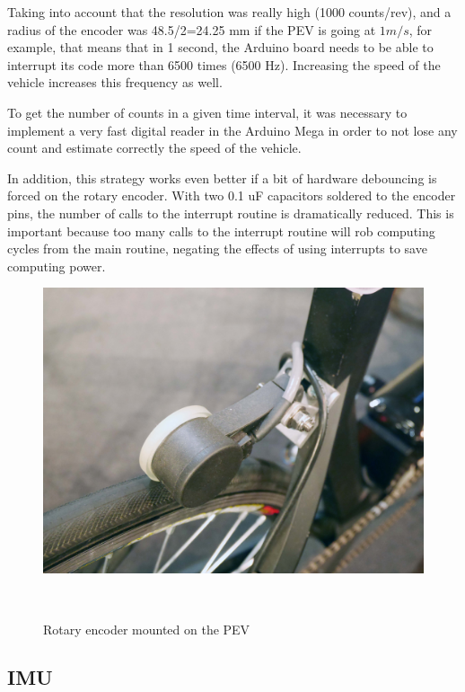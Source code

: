 Taking into account that the resolution was really high (1000 counts/rev), and a radius of the encoder was 48.5/2=24.25 mm if the PEV is going at $1m/s$, for example, that means that in 1 second, the Arduino board needs to be able to interrupt its code more than 6500 times (6500 Hz). Increasing the speed of the vehicle increases this frequency as well.

To get the number of counts in a given time interval, it was necessary to implement a very fast digital reader in the Arduino Mega in order to not lose any count and estimate correctly the speed of the vehicle. 

In addition, this strategy works even better if a bit of hardware debouncing is forced on the rotary encoder. With two 0.1 uF capacitors soldered to the encoder pins, the number of calls to the interrupt routine is dramatically reduced. This is important because too many calls to the interrupt routine will rob computing cycles from the main routine, negating the effects of using interrupts to save computing power.
\begin{figure}[h!]
	\includegraphics[width=1\linewidth]{figs/05/P1050728}
	\caption{Rotary encoder mounted on the PEV}
	\\[-2cm]
\end{figure}

\newpage
\subsection{IMU}

